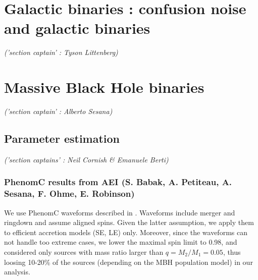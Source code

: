 \documentclass{iopart}
\begin{document}

\section{ Galactic binaries : confusion noise and galactic binaries}
\label{S:GalBin}
{ \it \small ('section captain' : Tyson Littenberg)}













\section{ Massive Black Hole binaries}
\label{S:MBHb}
{ \it ('section captain' : Alberto Sesana)}















\subsection{Parameter estimation}
\label{SS:MBHbPE}
{\it ('section captains' : Neil Cornish \& Emanuele Berti) }




\subsubsection{PhenomC results from AEI {(S. Babak, A. Petiteau, A. Sesana, F. Ohme, E. Robinson)}}
\label{SSS:MBHbPEPhenomAEI}
We use PhenomC waveforms described in \cite{sm10}. Waveforms include merger and ringdown and assume aligned spins. Given the latter assumption, we apply them to efficient accretion models (SE, LE) only. Moreover, since the waveforms can not handle too extreme cases, we lower the maximal spin limit to 0.98, and considered only sources with mass ratio larger than $q=M_2/M_1=0.05$, thus loosing 10-20\% of the sources (depending on the MBH population model) in our analysis.
\end{document}
